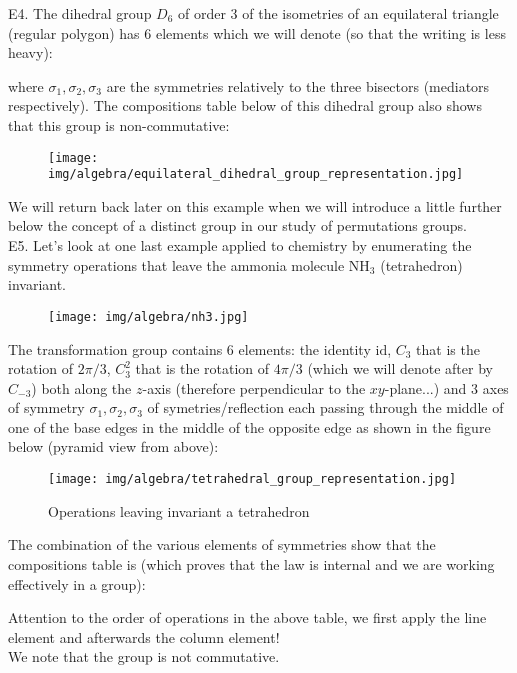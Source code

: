 	\pagebreak
	\begin{tcolorbox}[colframe=black,colback=white,sharp corners]
	E4. The dihedral group $D_6$ of order $3$ of the isometries of an equilateral triangle (regular polygon) has $6$ elements which we will denote (so that the writing is less heavy):
	
	where $\sigma_1,\sigma_2,\sigma_3$ are the symmetries relatively to the three bisectors (mediators respectively). The compositions table below of this dihedral group also shows that this group is non-commutative:
	\begin{figure}[H]
		\centering
		\texttt{[image: img/algebra/equilateral\_dihedral\_group\_representation.jpg]}
	\end{figure}
	
	We will return back later on this example when we will introduce a little further below the concept of a distinct group in our study of permutations groups.\\
	
	E5. Let's look at one last example applied to chemistry by enumerating the symmetry operations that leave the ammonia molecule NH$_3$ (tetrahedron) invariant.
	\begin{figure}[H]
		\centering
		\texttt{[image: img/algebra/nh3.jpg]}
	\end{figure}
	\end{tcolorbox}
	
	\pagebreak
	\begin{tcolorbox}[colframe=black,colback=white,sharp corners]
	The transformation group contains $6$ elements: the identity $\text{id}$, $C_3$ that is the rotation of $2\pi/3$, $C_3^2$ that is the rotation of $4\pi/3$ (which we will denote after by $C_{-3}$) both along the $z$-axis (therefore perpendicular to the $xy$-plane...) and $3$ axes of symmetry $\sigma_1,\sigma_2,\sigma_3$ of symetries/reflection each passing through the middle of one of the base edges in the middle of the opposite edge as shown in the figure below (pyramid view from above):
	\begin{figure}[H]
		\centering
		\texttt{[image: img/algebra/tetrahedral\_group\_representation.jpg]}
		\caption{Operations leaving invariant a tetrahedron}
	\end{figure}
	The combination of the various elements of symmetries show that the compositions table is (which proves that the law is internal and we are working effectively in a group):
	
	Attention to the order of operations in the above table, we first apply the line element and afterwards the column element!\\
	
	We note that the group is not commutative.
	\end{tcolorbox}

